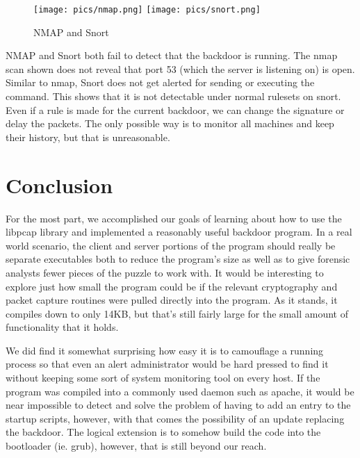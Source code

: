\documentclass[titlepage]{article}
\begin{document}
\clearpage

\begin{figure}[htb]                                                                       
  \begin{center}
    \texttt{[image: pics/nmap.png]}
    \texttt{[image: pics/snort.png]}
  \end{center}
  \caption{NMAP and Snort}
  \label{fig:bkdoor_nmap_snort}
\end{figure}

NMAP and Snort both fail to detect that the backdoor is running. The nmap scan shown
does not reveal that port 53 (which the server is listening on) is open.  Similar to
nmap, Snort does not get alerted for sending or executing the command.  This shows
that it is not detectable under normal rulesets on snort.  Even if a rule is made
for the current backdoor, we can change the signature or delay the packets.  The only
possible way is to monitor all machines and keep their history, but that is unreasonable.\\

\clearpage

\section{Conclusion}

For the most part, we accomplished our goals of learning about
how to use the libpcap library and implemented a reasonably
useful backdoor program. In a real world scenario, the client
and server portions of the program should really be separate
executables both to reduce the program's size as well as to
give forensic analysts fewer pieces of the puzzle to work with.
It would be interesting to explore just how small the program
could be if the relevant cryptography and packet capture routines
were pulled directly into the program. As it stands, it compiles
down to only 14KB, but that's still fairly large for the small
amount of functionality that it holds.

We did find it somewhat surprising how easy it is to camouflage
a running process so that even an alert administrator would be
hard pressed to find it without keeping some sort of system
monitoring tool on every host. If the program was compiled
into a commonly used daemon such as apache, it would be near
impossible to detect and solve the problem of having to add an
entry to the startup scripts, however, with that comes the
possibility of an update replacing the backdoor. The logical
extension is to somehow build the code into the bootloader (ie. grub),
however, that is still beyond our reach.
\end{document}
